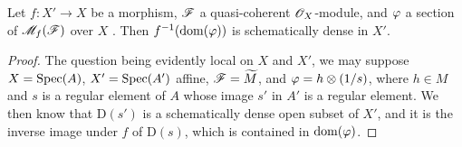 \begin{proposition}[20.2.15]
\label{IV.20.2.15}
Let $f:X'\to X$ be a morphism, $\mathscr{F}$ a quasi-coherent $\mathscr{O}_X$-module, and $\varphi$ a section of $\mathscr{M}_f(\mathscr{F})$ over $X$ .
Then $f^{-1}(\operatorname{dom}(\varphi))$ is schematically dense in $X'$.
\end{proposition}

\begin{proof}
The question being evidently local on $X$ and $X'$, we may suppose $X=\operatorname{Spec}(A)$, $X'=\operatorname{Spec}(A')$ affine, $\mathscr{F}=\widetilde{M}$, and $\varphi=h\otimes(1/s)$, where $h\in M$ and $s$ is a regular element of $A$ whose image $s'$ in $A'$ is a regular element.
We then know  that $\mathrm{D}(s')$ is a schematically dense open subset of $X'$, and it is the inverse image under $f$ of $\mathrm{D}(s)$, which is contained in $\operatorname{dom}(\varphi)$.
\end{proof}

